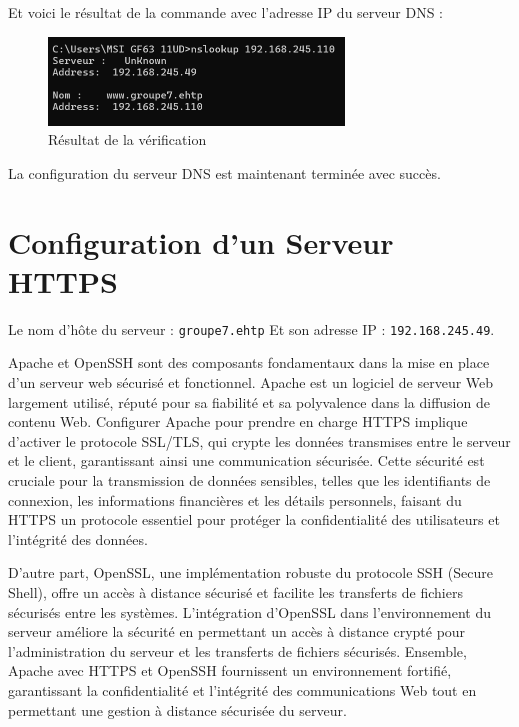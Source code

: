 	Et voici le résultat de la commande avec l’adresse IP du serveur DNS :
	
	\begin{figure}[h]
		\centering
		\includegraphics[width=0.7\textwidth]{DNS/test2.png}
		\caption{Résultat de la vérification}
		\label{fig:ridal}
	\end{figure}
	\newpage

	La configuration du serveur DNS est maintenant terminée avec succès.
	
	
	
		\newpage
	
		\newpage
\section{Configuration d'un Serveur HTTPS}

Le nom d'hôte du serveur : \texttt{groupe7.ehtp}  
Et son adresse IP : \texttt{192.168.245.49}.

Apache et OpenSSH sont des composants fondamentaux dans la mise en place d'un serveur web sécurisé et fonctionnel. Apache est un logiciel de serveur Web largement utilisé, réputé pour sa fiabilité et sa polyvalence dans la diffusion de contenu Web. Configurer Apache pour prendre en charge HTTPS implique d'activer le protocole SSL/TLS, qui crypte les données transmises entre le serveur et le client, garantissant ainsi une communication sécurisée. Cette sécurité est cruciale pour la transmission de données sensibles, telles que les identifiants de connexion, les informations financières et les détails personnels, faisant du HTTPS un protocole essentiel pour protéger la confidentialité des utilisateurs et l'intégrité des données.

D'autre part, OpenSSL, une implémentation robuste du protocole SSH (Secure Shell), offre un accès à distance sécurisé et facilite les transferts de fichiers sécurisés entre les systèmes. L'intégration d'OpenSSL dans l'environnement du serveur améliore la sécurité en permettant un accès à distance crypté pour l'administration du serveur et les transferts de fichiers sécurisés. Ensemble, Apache avec HTTPS et OpenSSH fournissent un environnement fortifié, garantissant la confidentialité et l'intégrité des communications Web tout en permettant une gestion à distance sécurisée du serveur.

